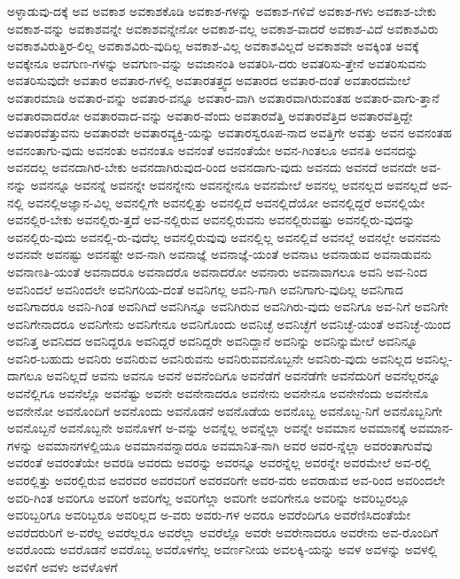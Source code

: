 {ಅಳ್ಳಾಡುವು-ದಕ್ಕೆ
ಅವ
ಅವಕಾಶ
ಅವಕಾಶಕೊಡಿ
ಅವಕಾಶ-ಗಳನ್ನು
ಅವಕಾಶ-ಗಳಿವೆ
ಅವಕಾಶ-ಗಳು
ಅವಕಾಶ-ಬೇಕು
ಅವಕಾಶ-ವನ್ನು
ಅವಕಾಶವನ್ನೇ
ಅವಕಾಶವನ್ನೇನೋ
ಅವಕಾಶ-ವಲ್ಲ
ಅವಕಾಶ-ವಾದರೆ
ಅವಕಾಶ-ವಿದೆ
ಅವಕಾಶವಿರು
ಅವಕಾಶವಿರುತ್ತಿರ-ಲಿಲ್ಲ
ಅವಕಾಶವಿರು-ವುದಿಲ್ಲ
ಅವಕಾಶ-ವಿಲ್ಲ
ಅವಕಾಶವಿಲ್ಲದೆ
ಅವಕಾಶವೇ
ಅವಕ್ಕಿಂತ
ಅವಕ್ಕೆ
ಅವಕ್ಕೇನೂ
ಅವಗುಣ-ಗಳನ್ನು
ಅವಗುಣ-ವನ್ನು
ಅವಜಾನಂತಿ
ಅವತರಿಸಿ-ದರು
ಅವತರಿಸು-ತ್ತೇನೆ
ಅವತರಿಸುವನು
ಅವತರಿಸುವುದೇ
ಅವತಾರ
ಅವತಾರ-ಗಳಲ್ಲಿ
ಅವತಾರತತ್ತ್ವದ
ಅವತಾರದ
ಅವತಾರ-ದಂತೆ
ಅವತಾರದಮೇಲೆ
ಅವತಾರಮಾಡಿ
ಅವತಾರ-ವನ್ನು
ಅವತಾರ-ವನ್ನೂ
ಅವತಾರ-ವಾಗಿ
ಅವತಾರವಾಗಿರುವಂತಹ
ಅವತಾರ-ವಾಗು-ತ್ತಾನೆ
ಅವತಾರವಾದರೋ
ಅವತಾರವಾದ-ವನ್ನು
ಅವತಾರ-ವೆಂದು
ಅವತಾರವೆತ್ತಿ
ಅವತಾರವೆತ್ತಿದ
ಅವತಾರವೆತ್ತಿದ್ದೇ
ಅವತಾರವೆತ್ತುವನು
ಅವತಾರವೇ
ಅವತಾರವ್ಯಕ್ತಿ-ಯನ್ನು
ಅವತಾರಸ್ವರೂಪ-ನಾದ
ಅವತ್ತಿಗೇ
ಅವತ್ತು
ಅವನ
ಅವನಂತಹ
ಅವನಂತಾಗು-ವುದು
ಅವನಂತು
ಅವನಂತೂ
ಅವನಂತೆ
ಅವನಂತೆಯೇ
ಅವನ-ಗಿಂತಲೂ
ಅವನತಿ
ಅವನದನ್ನು
ಅವನದಲ್ಲ
ಅವನದಾಗಿರ-ಬೇಕು
ಅವನದಾಗಿರುವುದ-ರಿಂದ
ಅವನದಾಗು-ವುದು
ಅವನದು
ಅವನದೆ
ಅವನದೇ
ಅವ-ನನ್ನು
ಅವನನ್ನೂ
ಅವನನ್ನೆ
ಅವನನ್ನೇ
ಅವನನ್ನೇನು
ಅವನನ್ನೇನೂ
ಅವನಮೇಲೆ
ಅವನಲ್ಲ
ಅವನಲ್ಲದ
ಅವನಲ್ಲದೆ
ಅವ-ನಲ್ಲಿ
ಅವನಲ್ಲಿಅಜ್ಞಾನ-ವಿಲ್ಲ
ಅವನಲ್ಲಿಗೇ
ಅವನಲ್ಲಿತ್ತು
ಅವನಲ್ಲಿದೆ
ಅವನಲ್ಲಿದೆಯೋ
ಅವನಲ್ಲಿದ್ದರೆ
ಅವನಲ್ಲಿಯೇ
ಅವನಲ್ಲಿರ-ಬೇಕು
ಅವನಲ್ಲಿರು-ತ್ತದೆ
ಅವ-ನಲ್ಲಿರುವ
ಅವನಲ್ಲಿರುವನು
ಅವನಲ್ಲಿರುವಷ್ಟು
ಅವನಲ್ಲಿರು-ವುದನ್ನು
ಅವನಲ್ಲಿರು-ವುದು
ಅವನಲ್ಲಿ-ರು-ವುದೆಲ್ಲ
ಅವನಲ್ಲಿರುವುವು
ಅವನಲ್ಲಿಲ್ಲ
ಅವನಲ್ಲಿವೆ
ಅವನಲ್ಲೆ
ಅವನಲ್ಲೇ
ಅವನವನು
ಅವನವೇ
ಅವನಷ್ಟು
ಅವನಷ್ಟೇ
ಅವ-ನಾಗಿ
ಅವನಾಜ್ಞೆ
ಅವನಾಜ್ಞೆ-ಯಂತೆ
ಅವನಾಟ
ಅವನಾಡುವ
ಅವನಾಡುವನು
ಅವನಾಣತಿ-ಯಂತೆ
ಅವನಾದರೂ
ಅವನಾದರೊ
ಅವನಾದರೋ
ಅವನಾರು
ಅವನಾವಾಗಲೂ
ಅವನಿ
ಅವ-ನಿಂದ
ಅವನಿಂದಲೆ
ಅವನಿಂದಲೇ
ಅವನಿಗರಿಯ-ದಂತೆ
ಅವನಿಗಲ್ಲ
ಅವನಿ-ಗಾಗಿ
ಅವನಿಗಾಗು-ವುದಿಲ್ಲ
ಅವನಿಗಾದ
ಅವನಿಗಾದರೂ
ಅವನಿ-ಗಿಂತ
ಅವನಿಗಿದೆ
ಅವನಿಗಿನ್ನೂ
ಅವನಿಗಿರುವ
ಅವನಿಗಿರು-ವುದು
ಅವನಿಗೂ
ಅವ-ನಿಗೆ
ಅವನಿಗೇ
ಅವನಿಗೇನಾದರೂ
ಅವನಿಗೇನು
ಅವನಿಗೇನೂ
ಅವನಿಗೊಂದು
ಅವನಿಚ್ಛೆ
ಅವನಿಚ್ಛೆಗೆ
ಅವನಿಚ್ಛೆ-ಯಂತೆ
ಅವನಿಚ್ಛೆ-ಯಿಂದ
ಅವನಿತ್ತ
ಅವನಿದದ
ಅವನಿದ್ದರೂ
ಅವನಿದ್ದರೆ
ಅವನಿದ್ದರೇ
ಅವನಿದ್ದಾನೆ
ಅವನಿನ್ನು
ಅವನಿನ್ನುಮೇಲೆ
ಅವನಿನ್ನೂ
ಅವನಿರ-ಬಹುದು
ಅವನಿರು
ಅವನಿರುವ
ಅವನಿರುವನು
ಅವನಿರುವವನೊಬ್ಬನೇ
ಅವನಿರು-ವುದು
ಅವನಿಲ್ಲದ
ಅವನಿಲ್ಲ-ದಾಗಲೂ
ಅವನಿಲ್ಲದೆ
ಅವನು
ಅವನೂ
ಅವನೆ
ಅವನೆಂದಿಗೂ
ಅವನೆಡೆಗೆ
ಅವನೆಡೆಗೇ
ಅವನೆದುರಿಗೆ
ಅವನೆಲ್ಲರನ್ನೂ
ಅವನೆಲ್ಲಿಗೂ
ಅವನೆಲ್ಲೊ
ಅವನೆಷ್ಟು
ಅವನೇ
ಅವನೇನಾದರೂ
ಅವನೇನು
ಅವನೇನೂ
ಅವನೇನೆಂದು
ಅವನೇನೊ
ಅವನೇನೋ
ಅವನೊಂದಿಗೆ
ಅವನೊಂದು
ಅವನೊಡನೆ
ಅವನೊಡೆಯ
ಅವನೊಬ್ಬ
ಅವನೊಬ್ಬ-ನಿಗೆ
ಅವನೊಬ್ಬನಿಗೇ
ಅವನೊಬ್ಬನೆ
ಅವನೊಬ್ಬನೇ
ಅವನೊಳಗೆ
ಅ-ವನ್ನು
ಅವನ್ನೆಲ್ಲ
ಅವನ್ನೆಲ್ಲಾ
ಅವನ್ನೇ
ಅವಮಾನ
ಅವಮಾನಕ್ಕೆ
ಅವಮಾನ-ಗಳನ್ನು
ಅವಮಾನಗಳಲ್ಲಿಯೂ
ಅವಮಾನವನ್ನಾದರೂ
ಅವಮಾನಿತ-ನಾಗಿ
ಅವರ
ಅವರ-ನ್ನೆಲ್ಲಾ
ಅವರಂತಾಗುವೆವು
ಅವರಂತೆ
ಅವರಂತೆಯೇ
ಅವರಡಿ
ಅವರದು
ಅವರನ್ನು
ಅವರನ್ನೂ
ಅವರನ್ನೆಲ್ಲ
ಅವರನ್ನೇ
ಅವರಮೇಲೆ
ಅವ-ರಲ್ಲಿ
ಅವರಲ್ಲಿತ್ತು
ಅವರಲ್ಲಿರುವ
ಅವರವರ
ಅವರವರಿಗೆ
ಅವರವರಿಗೇ
ಅವರ-ವರು
ಅವರಾಡುವ
ಅವ-ರಿಂದ
ಅವರಿಂದಲೇ
ಅವರಿ-ಗಿಂತ
ಅವರಿಗೂ
ಅವರಿಗೆ
ಅವರಿಗೆಲ್ಲ
ಅವರಿಗೆಲ್ಲಾ
ಅವರಿಗೇ
ಅವರಿಗೇನೂ
ಅವರಿನ್ನು
ಅವರಿಬ್ಬರಲ್ಲೂ
ಅವರಿಬ್ಬರಿಗೂ
ಅವರಿಬ್ಬರೂ
ಅವರಿಲ್ಲದ
ಅ-ವರು
ಅವರು-ಗಳ
ಅವರೂ
ಅವರೆಂದಿಗೂ
ಅವರೆಣಿಸಿದಂತೆಯೇ
ಅವರೆದರುರಿಗೆ
ಅ-ವರೆಲ್ಲ
ಅವರೆಲ್ಲರೂ
ಅವರೆಲ್ಲಾ
ಅವರೆಲ್ಲೊ
ಅವರೇ
ಅವರೇನಾದರೂ
ಅವರೇನು
ಅವ-ರೊಂದಿಗೆ
ಅವರೊಂದು
ಅವರೊಡನೆ
ಅವರೊಬ್ಬ
ಅವರೊಳಗೆಲ್ಲ
ಅವರ್ಣನೀಯ
ಅವಲಕ್ಕಿ-ಯನ್ನು
ಅವಳ
ಅವಳನ್ನು
ಅವಳಲ್ಲಿ
ಅವಳಿಗೆ
ಅವಳು
ಅವಳೊಳಗೆ
}
